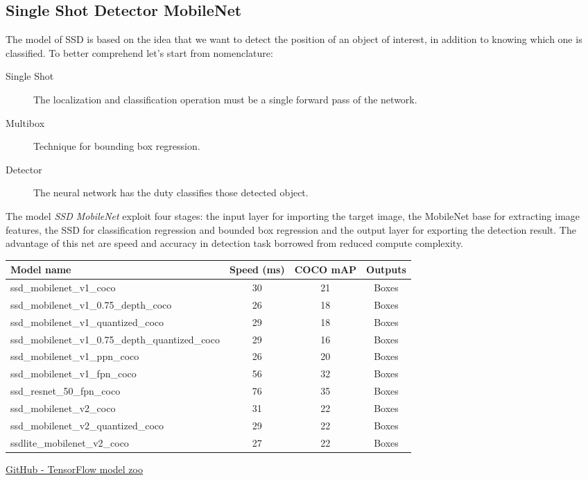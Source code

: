 \subsection{Single Shot Detector MobileNet}
\label{ssec:single-shot-detector}
The model of SSD is based on the idea that we want to detect the position of an 
object of interest, in addition to knowing which one is classified. 
To better comprehend let’s start from nomenclature: 
\begin{description}
\item[Single Shot] The localization and classification operation must be a single forward pass of the network.
\item[Multibox] Technique for bounding box regression.
\item[Detector] The neural network has the duty classifies those detected object.
\end{description}
%
The model \emph{SSD MobileNet} exploit four stages: the input layer for
importing the target image, the MobileNet base for extracting image features,
the SSD for classification regression and bounded box regression and the output
layer for exporting the detection result.\cite{Li_2018} 
The advantage of this net are speed and accuracy in detection task borrowed from
reduced compute complexity.
%
\begin{table}[htb]
	\centering
	\begin{tabular}{l c c c}
	\hline
		Model name								&Speed (ms)	& COCO mAP\footnotemark	& Outputs\\
		\hline
		\rowcolor{aliceblue!85}ssd\_mobilenet\_v1\_coco					&	30		&	21		&	Boxes\\
		ssd\_mobilenet\_v1\_0.75\_depth\_coco 		&	26		&	18		&	Boxes\\
		\rowcolor{aliceblue!85}ssd\_mobilenet\_v1\_quantized\_coco 		&	29		&	18		&	Boxes\\
		ssd\_mobilenet\_v1\_0.75\_depth\_quantized\_coco 	&	29		&	16		&	Boxes\\
		\rowcolor{aliceblue!85}ssd\_mobilenet\_v1\_ppn\_coco 				&	26		&	20		&	Boxes\\
		ssd\_mobilenet\_v1\_fpn\_coco 				&	56		&	32		&	Boxes\\
		\rowcolor{aliceblue!85}ssd\_resnet\_50\_fpn\_coco 					&	76		&	35		&	Boxes\\
		ssd\_mobilenet\_v2\_coco					&	31		&	22		&	Boxes\\
		\rowcolor{aliceblue!85}ssd\_mobilenet\_v2\_quantized\_coco			&	29		&	22		&	Boxes\\
		ssdlite\_mobilenet\_v2\_coco				&	27		&	22		&	Boxes\\
		\hline
	\end{tabular}
	{\href{https://github.com/tensorflow/models/blob/master/research/object_detection/g3doc/detection_model_zoo.md}{GitHub - TensorFlow model zoo}}
	\label{tab:mobilent-timing}
\end{table}
